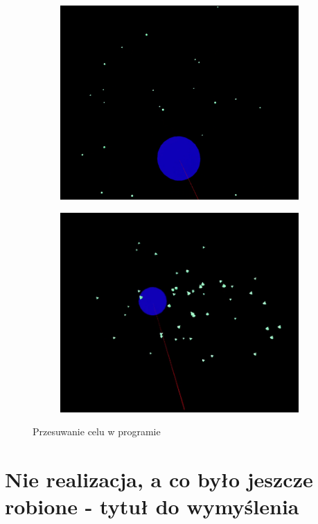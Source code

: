 \documentclass[a4paper,12pt,reqno]{article}
\begin{document}
\begin{figure}[H]%
	\centering
	\begin{subfigure}{.5\textwidth}
		\centering
		\includegraphics[width=0.8\linewidth]{graphics//boids/BoidsInUE_3.png}
		\label{ref:subref_a}
	\end{subfigure}%
	\begin{subfigure}{.5\textwidth}
		\centering
		\includegraphics[width=0.8\linewidth]{graphics//boids/BoidsInUE_4.png}
		\label{ref:subref_b}
	\end{subfigure}%
\caption{Przesuwanie celu w programie}
\label{ref:ref}
\end{figure}


\newpage
\section{Nie realizacja, a co było jeszcze robione - tytuł do wymyślenia}
\end{document}
